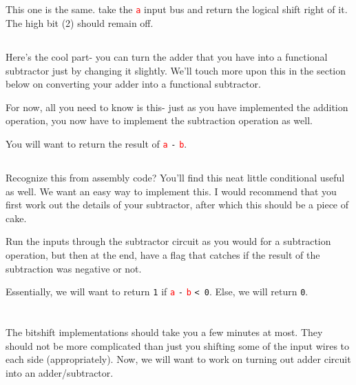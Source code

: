 \documentclass{article}
\newcommand{\varin}[1]{\textcolor{red}{\texttt{#1}}}
\begin{document}
\subsection{\selectfont{Bitshift Right}}

This one is the same. take the \varin{a} input bus and return the logical shift right of it. The high bit (2) should remain off.

\subsection{\selectfont{Subtraction}}

Here's the cool part- you can turn the adder that you have into a functional subtractor just by changing it slightly. We'll touch more upon this in the section below on converting your adder into a functional subtractor. 

For now, all you need to know is this- just as you have implemented the addition operation, you now have to implement the subtraction operation as well.

You will want to return the result of \varin{a} \texttt{-} \varin{b}.

\subsection{\selectfont{Set if Less Than (SLT)}}

Recognize this from assembly code? 
You'll find this neat little conditional useful as well.
We want an easy way to implement this. I would recommend that you first work out the details of your subtractor, after which this should be a piece of cake.

Run the inputs through the subtractor circuit as you would for a subtraction operation, but then at the end, have a flag that catches if the result of the subtraction was negative or not.

Essentially, we will want to return \texttt{1} if \varin{a} \texttt{-} \varin{b} \texttt{< 0}. Else, we will return \texttt{0}. 

\section{\selectfont{We Giveth (Adder) and We Taketh Away (Subtractor)}}

The bitshift implementations should take you a few minutes at most.
They should not be more complicated than just you shifting some of the input wires to each side (appropriately).
Now, we will want to work on turning out adder circuit into an adder/subtractor.
\end{document}
